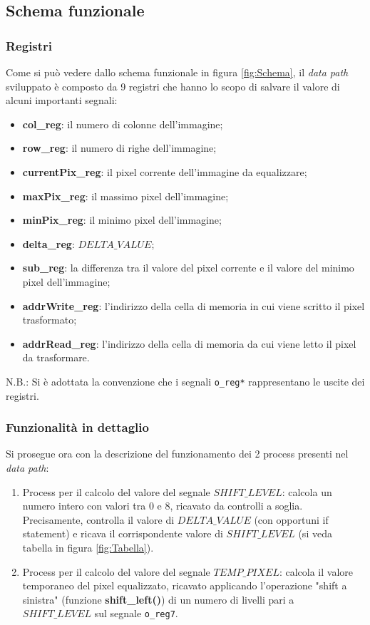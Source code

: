 \documentclass{article}
\begin{document}
\subsection{Schema funzionale}
\subsubsection{Registri}
Come si può vedere dallo schema funzionale in figura \ref{fig:Schema}, il \textit{data path} sviluppato è composto da 9 registri che hanno lo scopo di salvare il valore di alcuni importanti segnali:
\begin{itemize}
	\item \textbf{col\_reg}: il numero di colonne dell'immagine;
	\item \textbf{row\_reg}: il numero di righe dell'immagine;
	\item \textbf{currentPix\_reg}: il pixel corrente dell'immagine da equalizzare;
	\item \textbf{maxPix\_reg}: il massimo pixel dell'immagine;
	\item \textbf{minPix\_reg}: il minimo pixel dell'immagine;
	\item \textbf{delta\_reg}: $DELTA\_VALUE$;
	\item \textbf{sub\_reg}: la differenza tra il valore del pixel corrente e il valore del minimo pixel dell'immagine;
	\item \textbf{addrWrite\_reg}: l'indirizzo della cella di memoria in cui viene scritto il pixel trasformato;
	\item \textbf{addrRead\_reg}: l'indirizzo della cella di memoria da cui viene letto il pixel da trasformare.
\end{itemize}
\vspace{0.1cm}
\noindent N.B.: Si è adottata la convenzione che i segnali \verb^o_reg*^ rappresentano le uscite dei registri.

\subsubsection{Funzionalità in dettaglio}
Si prosegue ora con la descrizione del funzionamento dei 2 process presenti nel \textit{data path}: \vspace{0.2cm}
\begin{enumerate}
	\item Process per il calcolo del valore del segnale $SHIFT\_LEVEL$: calcola un numero intero con valori tra 0 e 8, ricavato da controlli a soglia. Precisamente, controlla il valore di $DELTA\_VALUE$ (con opportuni if statement) e ricava il corrispondente valore di $SHIFT\_LEVEL$ (si veda tabella in figura \ref{fig:Tabella}).
	\item Process per il calcolo del valore del segnale $TEMP\_PIXEL$: calcola il valore temporaneo del pixel equalizzato, ricavato applicando l'operazione "shift a sinistra" (funzione \textbf{shift\_left()}) di un numero di livelli pari a $SHIFT\_LEVEL$ sul segnale \verb^o_reg7^.
\end{enumerate}
\end{document}
